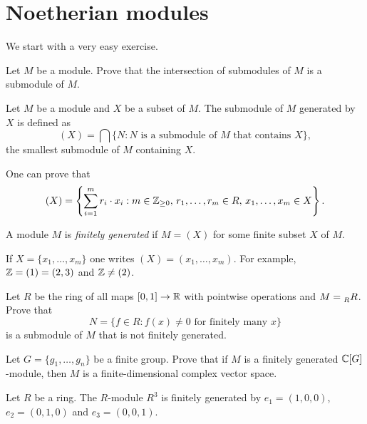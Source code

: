 \section{Noetherian modules}
\lecture\label{lec:NoetherianModules}

We start with a very easy exercise. 

\begin{exercise}
\label{xca:modules_intersection}
    Let $M$ be a module. 
    Prove that the intersection of submodules of $M$ 
    is a submodule of $M$. 
\end{exercise}

\begin{definition}
Let $M$ be a module and $X$ be a subset of $M$. The submodule
of $M$ generated by $X$ is defined as
\[
(X)=\bigcap\{N:N\text{ is a submodule of $M$ that contains $X$}\},
\]
the smallest submodule of $M$ containing $X$. 
\end{definition}

One can prove that  
\[
(X)=\left\{\sum_{i=1}^mr_i\cdot x_i:m\in\mathbb{Z}_{\geq0},\,r_1,\dots,r_m\in R,\,x_1,\dots,x_m\in X\right\}.
\]

\begin{definition}
    A module $M$ is \emph{finitely generated} if $M=(X)$ for some finite subset $X$ of $M$.
\end{definition}

If $X=\{x_1,\dots,x_m\}$ one writes $(X)=(x_1,\dots,x_m)$.
For example, $\mathbb{Z}=(1)=(2,3)$ and $\mathbb{Z}\ne (2)$.

\begin{exercise}
    Let $R$ be the ring of all maps $[0,1]\to\mathbb{R}$ with pointwise operations and 
    $M=\prescript{}{R}{R}$. Prove that
    \[ 
    N=\{f\in R:f(x)\ne0\text{ for finitely many $x$}\}
    \]
    is a submodule of $M$ that 
    is not finitely generated. 
\end{exercise}

\begin{exercise}
    Let $G=\{g_1,\dots,g_n\}$ be a finite group. Prove that if $M$ is
    a finitely generated $\mathbb{C}[G]$-module, 
    then $M$ is a finite-dimensional complex vector space. 
\end{exercise}

\begin{example}
    Let $R$ be a ring. The $R$-module $R^3$ is finitely generated 
    by $e_1=(1,0,0)$, $e_2=(0,1,0)$ and $e_3=(0,0,1)$. 
\end{example}

